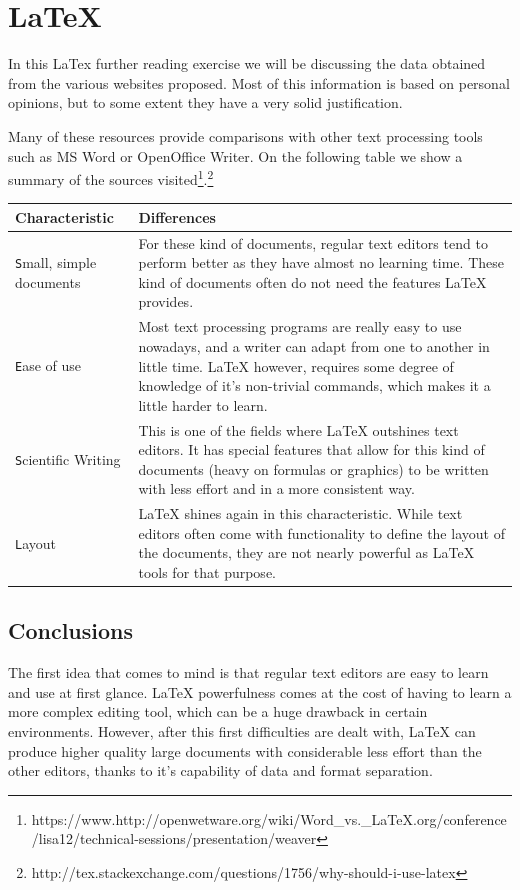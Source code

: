 \chapter{LaTeX}

In this LaTex further reading exercise we will be discussing the data obtained from the various websites proposed. Most of this information is based on personal opinions, but to some extent they have a very solid justification.

Many of these resources provide comparisons with other text processing tools such as MS Word or OpenOffice Writer. On the following table we show a summary of the sources visited\footnote{https://www.http://openwetware.org/wiki/Word\_vs.\_LaTeX.org/conference/lisa12/technical-sessions/presentation/weaver}.\footnote{http://tex.stackexchange.com/questions/1756/why-should-i-use-latex}

{
\centering
\begin{tabular}{l | p{8cm}}
Characteristic & Differences \\ \hline
\texttt Small, simple documents & For these kind of documents, regular text editors tend to perform better as they have almost no learning time. These kind of documents often do not need the features LaTeX provides. \\ \hline
\texttt Ease of use & Most text processing programs are really easy to use nowadays, and a writer can adapt from one to another in little time. LaTeX however, requires some degree of knowledge of it's non-trivial commands, which makes it a little harder to learn.  \\ \hline
\texttt Scientific Writing & This is one of the fields where LaTeX outshines text editors. It has special features that allow for this kind of documents (heavy on formulas or graphics) to be written with less effort and in a more consistent way.  \\ \hline
\texttt Layout & LaTeX shines again in this characteristic. While text editors often come with functionality to define the layout of the documents, they are not nearly powerful as LaTeX tools for that purpose.  \\ \hline
\end{tabular}
}



\section{Conclusions}
\label{sec:conclusions}

The first idea that comes to mind is that regular text editors are easy to learn and use at first glance. LaTeX powerfulness comes at the cost of having to learn a more complex editing tool, which can be a huge drawback in certain environments. However, after this first difficulties are dealt with, LaTeX can produce higher quality large documents with considerable less effort than the other editors, thanks to it's capability of data and format separation.

